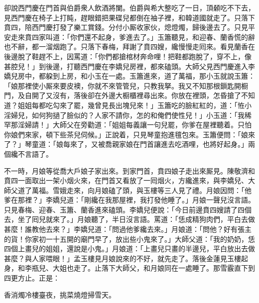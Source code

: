 卻說西門慶在門首與伯爵衆人飲酒將闌。伯爵與希大整吃了一日，頂顙吃不下去，見西門慶在椅子上打盹，趕眼錯把果碟兒都倒在袖子裡，{}和韓道國就走了。只落下賁四，陪西門慶打發了樂工賞錢。分付小厮收家伙，熄燈燭，歸後邊去了。只見平安走來賁四家叫道：「你們還不起身，爹進去了。」玉簫聽見，和迎春、蘭香慌的辭也不辭，都一溜烟跑了。只落下春梅，拜謝了賁四嫂，纔慢慢走囘來。{}看見蘭香在後邊脫了鞋趕不上，因罵道：「你們都搶棺材奔命哩！把鞋都跑脫了，穿不上，像甚腔兒！」到後邊，打聽西門慶在李嬌兒房裡，都來磕頭。大師父見西門慶進入李嬌兒房中，都躱到上房，和小玉在一處。玉簫進來，道了萬福，那小玉就說玉簫：「娘那裡使小厮來要皮襖，你就不來管管兒，只教我拏。我又不知那根鎻匙開橱門，及自開了又沒有，落後卻在外邊大橱櫃裡尋出來。你放在裡頭，怎昏搶了不知道？姐姐每都吃勾來了罷，幾曾見長出塊兒來！」玉簫吃的臉紅紅的，道：「恠小淫婦兒，如何狗撾了臉似的？人家不請你，怎的和俺們使性兒！」小玉道：「我稀罕那淫婦請！」{}大師父在旁勸道：「姐姐每義讓一句兒罷，你爹在屋裡聽着。只怕你娘們來家，頓下些茶兒伺候。」正說着，只見琴童抱進氊包來。玉簫便問：「娘來了？」琴童道：「娘每來了，又被喬親家娘在門首讓進去吃酒哩，也將好起身。」兩個纔不言語了。

不一時，月娘等從喬大戶娘子家出來。到家門首，賁四娘子走出來厮見。陳敬濟和賁四一面取出一架小烟火來，在門首又看放了一囘烟火，方纔進來，與李嬌兒、大師父道了萬福。雪娥走來，向月娘磕了頭，與玉樓等三人見了禮。月娘因問：「他爹在那裡？」李嬌兒道：「剛纔在我那屋裡，我打發他睡了。」月娘一聲兒沒言語。只見春梅、迎春、玉簫、蘭香進來磕頭。李嬌兒便說：「今日前邊賁四嫂請了四個去，坐了囘兒就來了。」月娘聽了，半日沒言語。罵道：「恁成精狗肉們，平白去做甚麼！誰教他去來？」李嬌兒道：「問過他爹纔去來。」月娘道：「問他？好有張主的貨！你家初一十五開的廟門早了，放出些小鬼來了。」大師父道：「我的奶奶，恁四個上畫兒的姐姐，還說是小鬼。」月娘道：「上畫兒只畫的半邊兒，平白放出去做甚麼？與人家喂眼！」孟玉樓見月娘說來的不好，就先走了。落後金蓮見玉樓起身，和李瓶兒、大姐也走了。止落下大師父，和月娘同在一處睡了。那雪霰直下到四更方止。正是：

\begin{myquote}
香消燭冷樓臺夜，挑菜燒燈掃雪天。
\end{myquote}

